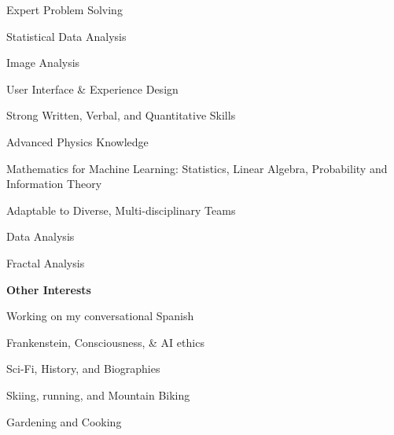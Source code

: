 \documentclass[letterpaper,final]{memoir}
\newcommand{\LargeSep}{\vspace{1.3em}}
\newcommand{\Sep}{\vspace{1.0em}}
\newcommand{\SmallSep}{\vspace{0.4em}}
\newcommand{\CVItem}[1]
	{\textbf{\color{Blue} #1}}
\begin{document}
\begin{multicols}{2}

    \begin{compactitem}[\color{Blue}$\circ$]

        \item Expert Problem Solving
        \SmallSep
        \item Statistical Data Analysis
        \SmallSep
        \item Image Analysis
        \SmallSep

        \item User Interface \& Experience Design
        \SmallSep
        \item Strong Written, Verbal, and Quantitative Skills
        \SmallSep
        \item Advanced Physics Knowledge
        \SmallSep
        \item Mathematics for Machine Learning: Statistics, Linear Algebra, Probability and Information Theory
        \SmallSep
        \item Adaptable to Diverse, Multi-disciplinary Teams
        \SmallSep
        \item Data Analysis
        \SmallSep
        \item Fractal Analysis




	\end{compactitem}

\end{multicols}



\CVItem{Other Interests}
\Sep

\begin{multicols}{2}

    \begin{compactitem}[\color{Blue}$\circ$]

        \item Working on my conversational Spanish
        \SmallSep
        \item Frankenstein, Consciousness, \& AI ethics
        \SmallSep
        \item Sci-Fi, History, and Biographies
        \SmallSep
        \item Skiing, running, and Mountain Biking
        \SmallSep
        \item Gardening and Cooking


	\end{compactitem}
\end{multicols}
\LargeSep
\end{document}
